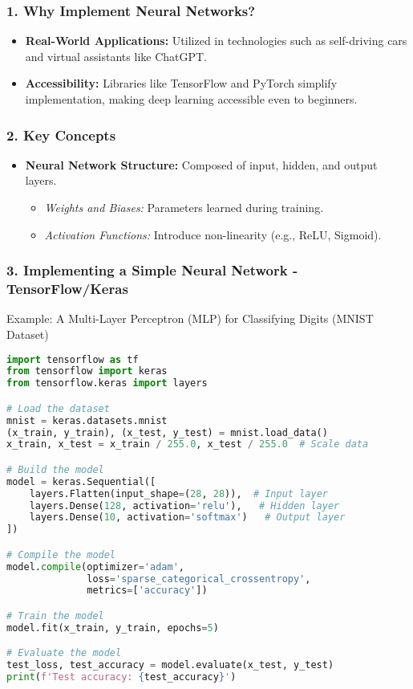 \documentclass[aspectratio=169]{beamer}
\begin{document}
\begin{frame}
    \frametitle{1. Why Implement Neural Networks?}
    \begin{itemize}
        \item \textbf{Real-World Applications:} Utilized in technologies such as self-driving cars and virtual assistants like ChatGPT.
        \item \textbf{Accessibility:} Libraries like TensorFlow and PyTorch simplify implementation, making deep learning accessible even to beginners.
    \end{itemize}
\end{frame}

\begin{frame}
    \frametitle{2. Key Concepts}
    \begin{itemize}
        \item \textbf{Neural Network Structure:} Composed of input, hidden, and output layers.
        \begin{itemize}
            \item \textit{Weights and Biases:} Parameters learned during training.
            \item \textit{Activation Functions:} Introduce non-linearity (e.g., ReLU, Sigmoid).
        \end{itemize}
    \end{itemize}
\end{frame}

\begin{frame}[fragile]
    \frametitle{3. Implementing a Simple Neural Network - TensorFlow/Keras}
    \begin{block}{Example: A Multi-Layer Perceptron (MLP) for Classifying Digits (MNIST Dataset)}
    \begin{lstlisting}[language=Python]
import tensorflow as tf
from tensorflow import keras
from tensorflow.keras import layers

# Load the dataset
mnist = keras.datasets.mnist
(x_train, y_train), (x_test, y_test) = mnist.load_data()
x_train, x_test = x_train / 255.0, x_test / 255.0  # Scale data

# Build the model
model = keras.Sequential([
    layers.Flatten(input_shape=(28, 28)),  # Input layer
    layers.Dense(128, activation='relu'),   # Hidden layer
    layers.Dense(10, activation='softmax')   # Output layer
])

# Compile the model
model.compile(optimizer='adam',
              loss='sparse_categorical_crossentropy',
              metrics=['accuracy'])

# Train the model
model.fit(x_train, y_train, epochs=5)

# Evaluate the model
test_loss, test_accuracy = model.evaluate(x_test, y_test)
print(f'Test accuracy: {test_accuracy}')
    \end{lstlisting}
    \end{block}
\end{frame}
\end{document}
